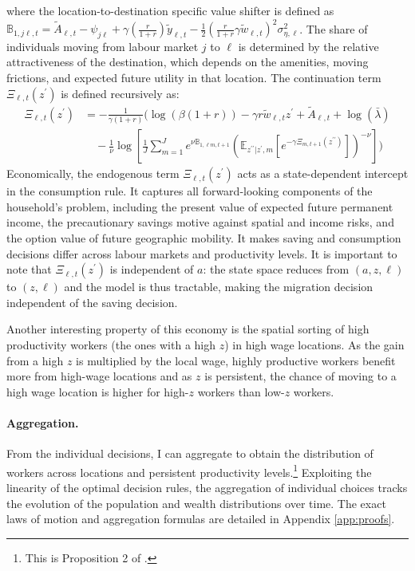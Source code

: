 \documentclass[12pt, a4paper]{article}
\begin{document}
where the location-to-destination specific value shifter is defined as $\mathbb{B}_{1,j\ell,t} = \tilde{A}_{\ell,t} - \psi_{j\ell} + \gamma \left(\frac{r}{1+r}\right) \tilde{y}_{\ell,t} - \frac{1}{2}\left(\frac{r}{1+r} \gamma \tilde{w}_{\ell,t}\right)^2 \sigma_{\eta,\ell}^2$. The share of individuals moving from labour market $j$ to $\ell$ is determined by the relative attractiveness of the destination, which depends on the amenities, moving frictions, and expected future utility in that location. The continuation term $\Xi_{\ell,t}(z^\prime)$ is defined recursively as:
\begin{align}
\Xi_{\ell,t}(z^\prime) &= -\frac{1}{\gamma(1+r)} \Bigg( \log(\beta(1+r)) - \gamma r \tilde{w}_{\ell,t}z^\prime + \tilde{A}_{\ell,t} + \log(\bar{\lambda}) \nonumber \\
&\quad - \frac{1}{\nu} \log \left[ \frac{1}{J} \sum_{m=1}^J e^{\nu \mathbb{B}_{1,\ell m, t+1}} \left( \mathbb{E}_{z^{\prime\prime} | z^\prime, m} \left[ e^{-\gamma \Xi_{m,t+1}(z^{\prime\prime})} \right] \right)^{-\nu} \right] \Bigg) \label{eq:Xi}
\end{align}
Economically, the endogenous term $\Xi_{\ell,t}(z^\prime)$ acts as a state-dependent intercept in the consumption rule. It captures all forward-looking components of the household's problem, including the present value of expected future permanent income, the precautionary savings motive against spatial and income risks, and the option value of future geographic mobility. It makes saving and consumption decisions differ across labour markets and productivity levels. It is important to note that $\Xi_{\ell,t}(z^\prime)$ is independent of $a$: the state space reduces from $(a, z, \ell)$ to $(z, \ell)$ and the model is thus tractable, making the migration decision independent of the saving decision. 

Another interesting property of this economy is the spatial sorting of high productivity workers (the ones with a high $z$) in high wage locations. As the gain from a high $z$ is multiplied by the local wage, highly productive workers benefit more from high-wage locations and as $z$ is persistent, the chance of moving to a high wage location is higher for high-$z$ workers than low-$z$ workers.

\paragraph{Aggregation.} From the individual decisions, I can aggregate to obtain the distribution of workers across locations and persistent productivity levels.\footnote{This is Proposition 2 of \citet{dvorkin_geography_2025}.} Exploiting the linearity of the optimal decision rules, the aggregation of individual choices tracks the evolution of the population and wealth distributions over time. The exact laws of motion and aggregation formulas are detailed in Appendix \ref{app:proofs}.
\end{document}
